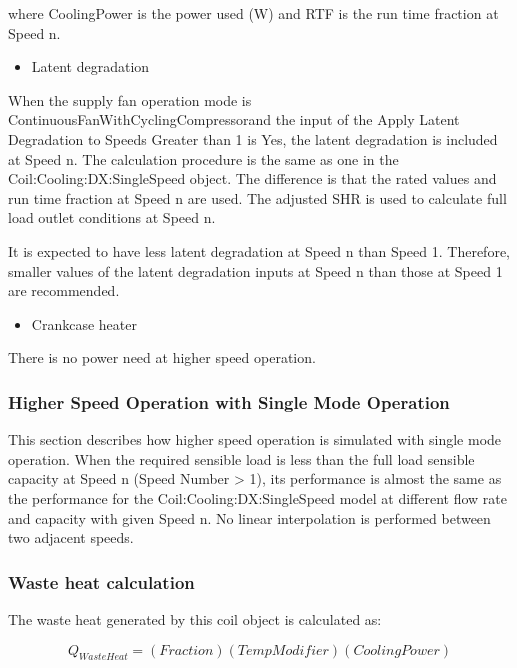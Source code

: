 where CoolingPower is the power used (W) and RTF is the run time fraction at Speed n.

\begin{itemize}
  \item Latent degradation
\end{itemize}

When the supply fan operation mode is ContinuousFanWithCyclingCompressorand the input of the Apply Latent Degradation to Speeds Greater than 1 is Yes, the latent degradation is included at Speed n. The calculation procedure is the same as one in the Coil:Cooling:DX:SingleSpeed object. The difference is that the rated values and run time fraction at Speed n are used. The adjusted SHR is used to calculate full load outlet conditions at Speed n.

It is expected to have less latent degradation at Speed n than Speed 1. Therefore, smaller values of the latent degradation inputs at Speed n than those at Speed 1 are recommended.

\begin{itemize}
  \item Crankcase heater
\end{itemize}

There is no power need at higher speed operation.

\subsubsection{Higher Speed Operation with Single Mode Operation}\label{higher-speed-operation-with-single-mode-operation}

This section describes how higher speed operation is simulated with single mode operation. When the required sensible load is less than the full load sensible capacity at Speed n (Speed Number \textgreater{} 1), its performance is almost the same as the performance for the Coil:Cooling:DX:SingleSpeed model at different flow rate and capacity with given Speed n. No linear interpolation is performed between two adjacent speeds.

\subsubsection{Waste heat calculation}\label{waste-heat-calculation-000}

The waste heat generated by this coil object is calculated as:

\begin{equation}
{Q_{WasteHeat}} = (Fraction)(TempModifier)(CoolingPower)
\end{equation}

